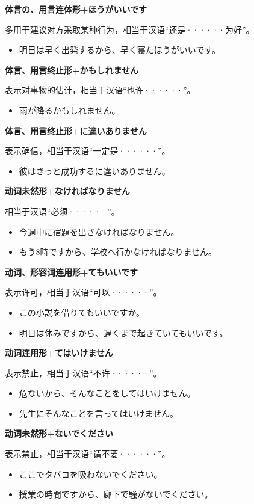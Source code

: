 {\bf
\noindent 体言の、用言连体形+ほうがいいです
}

多用于建议对方采取某种行为，相当于汉语``还是······为好''。
\begin{itemize}
  \item 明日は早く出発するから、早く寝たほうがいいです。
\end{itemize}

{\bf
\noindent 体言、用言终止形+かもしれません
}

表示对事物的估计，相当于汉语``也许······''。
\begin{itemize}
  \item 雨が降るかもしれません。
\end{itemize}

{\bf
\noindent 体言、用言终止形+に違いありません
}

表示确信，相当于汉语``一定是······''。
\begin{itemize}
  \item 彼はきっと成功するに違いありません。
\end{itemize}

{\bf
\noindent 动词未然形+なければなりません
}

相当于汉语``必须······''。
\begin{itemize}
  \item 今週中に宿題を出さなければなりません。
  \item もう8時ですから、学校へ行かなければなりません。
\end{itemize}

{\bf
\noindent 动词、形容词连用形+てもいいです
}

表示许可，相当于汉语``可以······''。
\begin{itemize}
  \item この小説を借りてもいいですか。
  \item 明日は休みですから、遅くまで起きていてもいいです。
\end{itemize}

{\bf
\noindent 动词连用形+てはいけません
}

表示禁止，相当于汉语``不许······''。
\begin{itemize}
  \item 危ないから、そんなことをしてはいけません。
  \item 先生にそんなことを言ってはいけません。
\end{itemize}

{\bf
\noindent 动词未然形+ないでください
}

表示禁止，相当于汉语``请不要······''。
\begin{itemize}
  \item ここでタバコを吸わないでください。
  \item 授業の時間ですから、廊下で騒がないでください。
\end{itemize}

